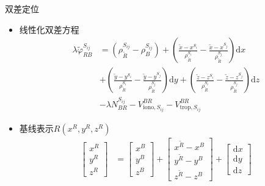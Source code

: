 \begin{frame}{双差定位}
    \begin{itemize}
        \item 线性化双差方程
        \begin{align*}
            \lambda \tilde \varphi _ { RB } ^ { S _ { ij } } &= \left( \rho _ { \tilde R } ^ { S _ { ij } } - \rho _ B ^ { S _ { ij } } \right)
            + \left( \frac{ \tilde x - x ^ { S _ i } }{ \rho _ { \tilde R } ^ { S _ i } }
            - \frac{ \tilde x - x ^ { S _ j } }{ \rho _ { \tilde R } ^ { S _ j } } \right) \mathrm d x \\
            &+ \left( \frac{ \tilde y - y ^ { S _ i } }{ \rho _ { \tilde R } ^ { S _ i } }
            - \frac{ \tilde y - y ^ { S _ j } }{ \rho _ { \tilde R } ^ { S _ j } } \right) \mathrm d y
            + \left( \frac{ \tilde z - z ^ { S _ i } }{ \rho _ { \tilde R } ^ { S _ i } }
            - \frac{ \tilde z - z ^ { S _ j } }{ \rho _ { \tilde R } ^ { S _ j } } \right) \mathrm d z \\
            &- \lambda N _ { BR } ^ { S _ { ij } } - V _ { \mathrm{ iono }, S _ { ij } } ^ { BR } - V _ { \mathrm{ trop }, S _ { ij } } ^ { BR }
        \end{align*}
        \item 基线表示$R\left( x ^ R, y ^ R, z ^R \right)$
        \begin{align*}
            \begin{bmatrix} x ^ R \\ y ^ R \\ z ^ R \end{bmatrix} &=
            \begin{bmatrix} x ^ B \\ y ^ B \\ z ^ B \end{bmatrix} +
            \begin{bmatrix} x ^ { \tilde R } - x ^ B \\ y ^ { \tilde R } - y ^ B \\ z ^ { \tilde R } - z ^ B \end{bmatrix} +
            \begin{bmatrix} \mathrm d x \\ \mathrm d y \\ \mathrm d z \end{bmatrix}
        \end{align*}
    \end{itemize}
\end{frame}
